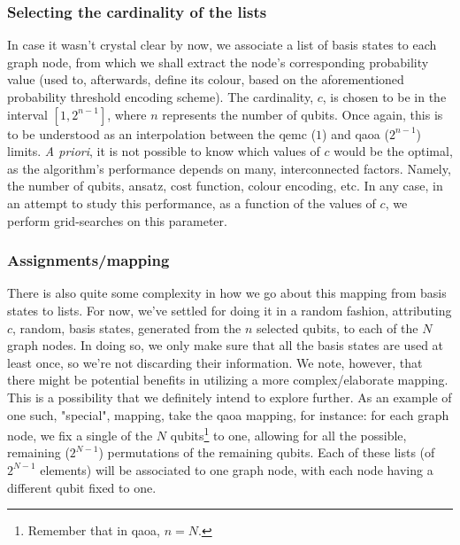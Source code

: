 \subsubsection*{Selecting the cardinality of the lists}
In case it wasn't crystal clear by now, we associate a list of basis states to each graph node, from which we shall extract the node's corresponding probability value (used to, afterwards, define its colour, based on the aforementioned probability threshold encoding scheme). The cardinality, $c$, is chosen to be in the interval $\left[1, 2^{n-1}\right]$, where $n$ represents the number of qubits. Once again, this is to be understood as an interpolation between the \acrshort{qemc} ($1$) and \acrshort{qaoa} ($2^{n-1}$) limits. \textit{A priori}, it is not possible to know which values of $c$ would be the optimal, as the algorithm's performance depends on many, interconnected factors. Namely, the number of qubits, ansatz, cost function, colour encoding, etc. In any case, in an attempt to study this performance, as a function of the values of $c$, we perform grid-searches on this parameter.

\subsubsection*{Assignments/mapping}
There is also quite some complexity in how we go about this mapping from basis states to lists. For now, we've settled for doing it in a random fashion, attributing $c$, random, basis states, generated from the $n$ selected qubits, to each of the $N$ graph nodes. In doing so, we only make sure that all the basis states are used at least once, so we're not discarding their information. We note, however, that there might be potential benefits in utilizing a more complex/elaborate mapping. This is a possibility that we definitely intend to explore further. As an example of one such, "special", mapping, take the \acrshort{qaoa} mapping, for instance: for each graph node, we fix a single of the $N$ qubits\footnote{Remember that in \acrshort{qaoa}, $n = N$.} to one, allowing for all the possible, remaining ($2^{N-1}$) permutations of the remaining qubits. Each of these lists (of $2^{N-1}$ elements) will be associated to one graph node, with each node having a different qubit fixed to one.

